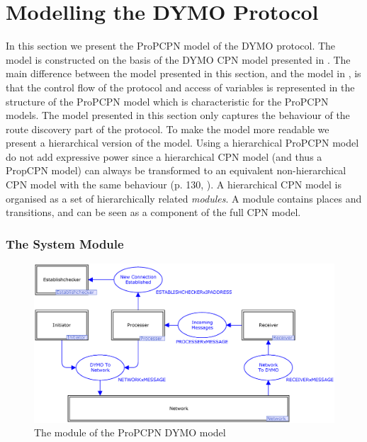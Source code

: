 \section{Modelling the DYMO Protocol}
\label{sec:dymomodel}

In this section we present the ProPCPN model of the DYMO protocol. The model is constructed on the basis of the DYMO CPN model presented in \cite{RefWorks:6}. The main difference between the model presented in this section, and the model in \cite{RefWorks:6}, is that the control flow of the protocol and access of variables is represented in the structure of the ProPCPN model which is characteristic for the ProPCPN models. The model presented in this section only captures the behaviour of the route discovery part of the protocol. To make the model more readable we present a hierarchical version of the model. Using a hierarchical ProPCPN model do not add expressive power since a hierarchical CPN model (and thus a PropCPN model) can always be transformed to an equivalent non-hierarchical CPN model with the same behaviour (p. 130, \cite{RefWorks:87}). A hierarchical CPN model is organised as a set of hierarchically related \emph{modules}. A module contains places and transitions, and can be seen as a component of the full CPN model.

\subsubsection{The System Module}

\begin{figure}[b!]
\centering
\includegraphics[width=\textwidth]{dymo/graphics/systemmodule.eps}
\caption{The  module of the ProPCPN DYMO model}
\label{fig:dymosystemmodule}
\end{figure}

